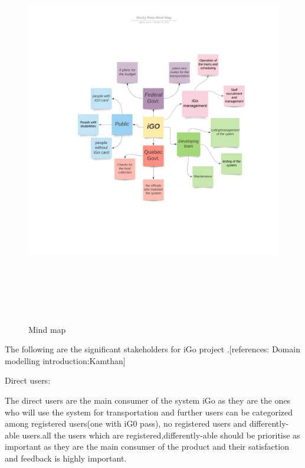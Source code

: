 \documentclass[12pt]{report}
\begin{document}
\begin{figure}[H]
	\begin{Center}
		\includegraphics[width=450.75pt,height=486.75pt]{./p2_image2.jpeg}
	\end{Center}
  \caption{Mind map}
\end{figure}





\vspace{\baselineskip}
The following are the significant stakeholders for iGo project .[references: Domain modelling introduction:Kamthan]\par



\vspace{\baselineskip}
Direct users:\par

The direct users are the main consumer of the system iGo as they are the ones who will use the system for transportation and further users can be categorized among registered users(one with iG0 pass), no registered users and differently-able users.all the users which are registered,differently-able should be prioritise as important as they are the main consumer of the product and their satisfaction and feedback is highly important.\par
\end{document}
